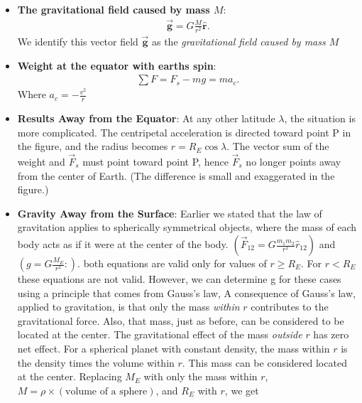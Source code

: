 \documentclass{report}
\begin{document}
\begin{itemize}
        \item \textbf{The gravitational field caused by mass $M$}:
            \begin{align*}
                \vec{\mathbf{g}} = G \frac{M}{r^{2}}\hat{\mathbf{r}}
            .\end{align*}
            \bigbreak \noindent 
            We identify this vector field $\vec{\mathbf{g}}$ as the \textit{gravitational field caused by mass $M$}
        \item \textbf{Weight at the equator with earths spin}:
            \begin{align*}
                \sum F = F_{s} -mg = ma_{c}
            .\end{align*}
            Where $a_{c} = -\frac{v^{2}}{r} $
        \item \textbf{Results Away from the Equator}:
            At any other latitude $\lambda$, the situation is more complicated. The centripetal acceleration is directed toward point P in the figure, and the radius becomes $r = R_E \cos \lambda$. The vector sum of the weight and $\vec{F}_s$ must point toward point P, hence $\vec{F}_s$ no longer points away from the center of Earth. (The difference is small and exaggerated in the figure.)
            \bigbreak \noindent
        \item \textbf{Gravity Away from the Surface}: Earlier we stated that the law of gravitation applies to spherically symmetrical objects, where the mass of each body acts as if it were at the center of the body. $\left(\vec{F}_{12} = G \frac{m_1 m_2}{r^2} \hat{r}_{12}\right)$ and $\left(g = G \frac{M_E}{r^2}:\right) $. 
            \bigbreak \noindent 
            both equations are valid only for values of $r \geq R_{E}$. For $r < R_{E}$ these equations are not valid. However, we can determine g for these cases using a principle that comes from Gauss’s law,
            \bigbreak \noindent 
            A consequence of Gauss’s law, applied to gravitation, is that only the mass \textit{within} $r$ contributes to the gravitational force. Also, that mass, just as before, can be considered to be located at the center. The gravitational effect of the mass \textit{outside} $r$ has zero net effect.
            \bigbreak \noindent 
            For a spherical planet with constant density, the mass within $r$ is the density times the volume within $r$. This mass can be considered located at the center. Replacing $M_E$ with only the mass within $r$, $M = \rho \times (\text{volume of a sphere})$, and $R_E$ with $r$, we get 

\end{itemize}
\end{document}
